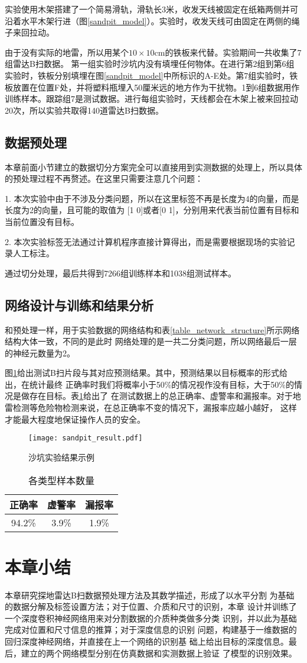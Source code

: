 实验使用木架搭建了一个简易滑轨，滑轨长3米，收发天线被固定在纸箱两侧并可沿着水平木架行进（图\ref{sandpit_model}）。实验时，收发天线可由固定在两侧的绳子来回拉动。

由于没有实际的地雷，所以用某个$10\times 10$cm的铁板来代替。实验期间一共收集了7组雷达B扫数据。
第一组实验时沙坑内没有填埋任何物体。在进行第2组到第6组实验时，铁板分别填埋在图\ref{sandpit_model}中所标识的A-E处。第7组实验时，铁板放置在位置F处，并将塑料瓶埋入50厘米远的地方作为干扰物。1到6组数据用作训练样本。跟踪组7是测试数据。进行每组实验时，天线都会在木架上被来回拉动20次，所以实验共取得140道雷达B扫数据。
\subsection{数据预处理}
本章前面小节建立的数据切分方案完全可以直接用到实测数据的处理上，所以具体的预处理过程不再赘述。在这里只需要注意几个问题：

1. 本次实验中由于不涉及分类问题，所以在这里标签不再是长度为4的向量，而是长度为2的向量，且可能的取值为
[1 0]或者[0 1]，分别用来代表当前位置有目标和当前位置没有目标。

2. 本次实验标签无法通过计算机程序直接计算得出，而是需要根据现场的实验记录人工标注。

通过切分处理，最后共得到7266组训练样本和1038组测试样本。
\subsection{网络设计与训练和结果分析}
和预处理一样，用于实验数据的网络结构和表\ref{table_network_structure}所示网络结构大体一致，不同的是此时
网络处理的是一共二分类问题，所以网络最后一层的神经元数量为2。

图\ref{sandpit_result}给出测试B扫片段与其对应预测结果。其中，预测结果以目标概率的形式给出，在统计最终
正确率时我们将概率小于50\%的情况视作没有目标，大于50\%的情况是做存在目标。表\ref{table_sanpit_acc}给出了
在测试数据上的总正确率、虚警率和漏报率。对于地雷检测等危险物检测来说，在总正确率不变的情况下，漏报率应越小越好，
这样才能最大程度地保证操作人员的安全。
\begin{figure}[htbp]
	\texttt{[image: sandpit\_result.pdf]}
	\caption[]{沙坑实验结果示例}
	\label{sandpit_result}
\end{figure}

\begin{table}[h]
	\caption{各类型样本数量} 
	\begin{tabular}{|c|c|c|} 
		\hline  
		正确率 & 虚警率 & 漏报率\\
		\hline
		94.2\% & 3.9\% & 1.9\%\\
		\hline
	\end{tabular}
	\label{table_sanpit_acc}
\end{table}
\section{本章小结}
本章研究探地雷达B扫数据预处理方法及其数学描述，形成了以水平分割
为基础的数据分解及标签设置方法；对于位置、介质和尺寸的识别，本章
设计并训练了一个深度卷积神经网络用来对分割数据的介质种类做多分类
识别，并以此为基础完成对位置和尺寸信息的推算；对于深度信息的识别
问题，构建基于一维数据的回归深度神经网络，并直接在上一个网络的识别基
础上给出目标的深度信息。最后，建立的两个网络模型分别在仿真数据和实测数据上验证
了模型的识别效果。